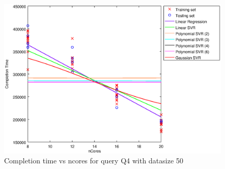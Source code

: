 
\begin {figure}[hbtp]
\centering
\includegraphics[width=\textwidth]{output/Q4_50_ALL_FEATURES/plot_Q4_50.eps}
\caption{Completion time vs ncores for query Q4 with datasize 50}
\label{fig:all_linear_Q4_50}
\end {figure}
